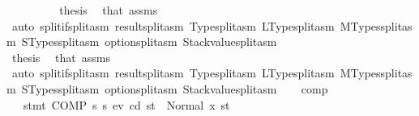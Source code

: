 \begin{isabellebody}
\ \ \ \ \ \ \isamarkupfalse%
\ \isamarkupfalse%
\ {\isacharquery}{\kern0pt}thesis\ \isamarkupfalse%
\ that{\isacharparenleft}{\kern0pt}{}{}{\isacharparenright}{\kern0pt}\ assms\ {}\isanewline
\ \ \ \ \ \ \ \ \isamarkupfalse%
\ {\isacharparenleft}{\kern0pt}auto\ split{\isacharcolon}{\kern0pt}if{\isacharunderscore}{\kern0pt}split{\isacharunderscore}{\kern0pt}asm\ result{\isachardot}{\kern0pt}split{\isacharunderscore}{\kern0pt}asm\ Type{\isachardot}{\kern0pt}split{\isacharunderscore}{\kern0pt}asm\ LType{\isachardot}{\kern0pt}split{\isacharunderscore}{\kern0pt}asm\ MTypes{\isachardot}{\kern0pt}split{\isacharunderscore}{\kern0pt}asm\ STypes{\isachardot}{\kern0pt}split{\isacharunderscore}{\kern0pt}asm\ option{\isachardot}{\kern0pt}split{\isacharunderscore}{\kern0pt}asm\ Stackvalue{\isachardot}{\kern0pt}split{\isacharunderscore}{\kern0pt}asm{\isacharparenright}{\kern0pt}\isanewline
\ \ \ \ \isamarkupfalse%
\isanewline
\ \ \isamarkupfalse%
\isanewline
\ \ \ \ \isamarkupfalse%
\ {}\isanewline
\ \ \ \ \isamarkupfalse%
\ \isamarkupfalse%
\ {\isacharquery}{\kern0pt}thesis\ \isamarkupfalse%
\ that{\isacharparenleft}{\kern0pt}{}{}{\isacharparenright}{\kern0pt}\ assms\isanewline
\ \ \ \ \ \ \isamarkupfalse%
\ {\isacharparenleft}{\kern0pt}auto\ split{\isacharcolon}{\kern0pt}if{\isacharunderscore}{\kern0pt}split{\isacharunderscore}{\kern0pt}asm\ result{\isachardot}{\kern0pt}split{\isacharunderscore}{\kern0pt}asm\ Type{\isachardot}{\kern0pt}split{\isacharunderscore}{\kern0pt}asm\ LType{\isachardot}{\kern0pt}split{\isacharunderscore}{\kern0pt}asm\ MTypes{\isachardot}{\kern0pt}split{\isacharunderscore}{\kern0pt}asm\ STypes{\isachardot}{\kern0pt}split{\isacharunderscore}{\kern0pt}asm\ option{\isachardot}{\kern0pt}split{\isacharunderscore}{\kern0pt}asm\ Stackvalue{\isachardot}{\kern0pt}split{\isacharunderscore}{\kern0pt}asm{\isacharparenright}{\kern0pt}\isanewline
\ \ \isamarkupfalse%
\isanewline
{}\isamarkupfalse%
%
\endisatagproof
{\isafoldproof}%
%
\isadelimproof
\isanewline
%
\endisadelimproof
\isanewline
{}\isamarkupfalse%
\ comp{\isacharcolon}{\kern0pt}\isanewline
\ \ \ {\isachardoublequoteopen}stmt\ {\isacharparenleft}{\kern0pt}COMP\ s{}\ s{}{\isacharparenright}{\kern0pt}\ ev\ cd\ st\ {\isacharequal}{\kern0pt}\ Normal\ {\isacharparenleft}{\kern0pt}x{\isacharcomma}{\kern0pt}\ st{\isacharprime}{\kern0pt}{\isacharparenright}{\kern0pt}{\isachardoublequoteclose}\isanewline

\end{isabellebody}
